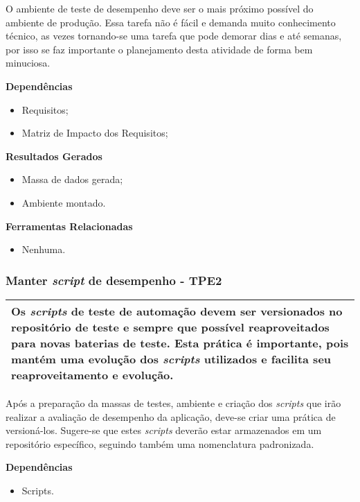 O ambiente de teste de desempenho deve ser o mais próximo possível do ambiente de produção. Essa tarefa não é fácil e demanda muito conhecimento técnico, as vezes tornando-se uma tarefa que pode demorar dias e até semanas, por isso se faz importante o planejamento desta atividade de forma bem minuciosa.

\textbf{Dependências}
\begin{itemize}
    \item Requisitos;
    \item Matriz de Impacto dos Requisitos;
\end{itemize}

\textbf{Resultados Gerados}
\begin{itemize}
    \item Massa de dados gerada;
    \item Ambiente montado.
\end{itemize}

\textbf{Ferramentas Relacionadas}
\begin{itemize}
    \item Nenhuma.
\end{itemize}

\subsubsection{Manter \textit{script} de desempenho - TPE2}
\label{sec:tpe2}

\begin{table}[H]
\centering
\begin{tabular}{|p{130mm}|}
\hline
Os \textit{scripts} de teste de automação devem ser versionados no repositório de teste e sempre que possível reaproveitados para novas baterias de teste. Esta prática é importante, pois mantém uma evolução dos \textit{scripts} utilizados e facilita seu reaproveitamento e evolução.\\ 
\hline
\end{tabular}
\end{table}

Após a preparação da massas de testes, ambiente e criação dos \textit{scripts} que irão realizar a avaliação de desempenho da aplicação, deve-se criar uma prática de versioná-los. Sugere-se que estes \textit{scripts} deverão estar armazenados em um repositório específico, seguindo também uma nomenclatura padronizada.

\textbf{Dependências}
\begin{itemize}
    \item Scripts.
\end{itemize}


